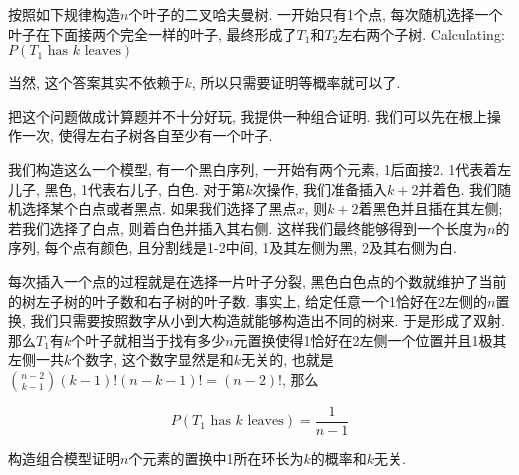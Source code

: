 	\begin{prob} [二叉树$\uppercase\expandafter{\romannumeral5}$]
		
		按照如下规律构造$n$个叶子的二叉哈夫曼树. 一开始只有1个点, 每次随机选择一个叶子在下面接两个完全一样的叶子, 最终形成了$T_1$和$T_2$左右两个子树. Calculating: $P(T_1 \text{ has } k \text{ leaves})$
		
		当然, 这个答案其实不依赖于$k$, 所以只需要证明等概率就可以了.
		
		\sol
		
		把这个问题做成计算题并不十分好玩, 我提供一种组合证明. 我们可以先在根上操作一次, 使得左右子树各自至少有一个叶子.
		
		我们构造这么一个模型, 有一个黑白序列, 一开始有两个元素, 1后面接2. 1代表着左儿子, 黑色, 1代表右儿子, 白色. 对于第$k$次操作, 我们准备插入$k + 2$并着色. 我们随机选择某个白点或者黑点. 如果我们选择了黑点$x$, 则$k + 2$着黑色并且插在其左侧; 若我们选择了白点, 则着白色并插入其右侧. 这样我们最终能够得到一个长度为$n$的序列, 每个点有颜色, 且分割线是1-2中间, 1及其左侧为黑, 2及其右侧为白. 
		
		每次插入一个点的过程就是在选择一片叶子分裂, 黑色白色点的个数就维护了当前的树左子树的叶子数和右子树的叶子数. 事实上, 给定任意一个1恰好在2左侧的$n$置换, 我们只需要按照数字从小到大构造就能够构造出不同的树来. 于是形成了双射. 那么$T_1$有$k$个叶子就相当于找有多少$n$元置换使得1恰好在2左侧一个位置并且1极其左侧一共$k$个数字, 这个数字显然是和$k$无关的, 也就是$\binom{n - 2}{k - 1} (k - 1)! (n - k - 1)! = (n - 2)!$, 那么
		
		\begin{equation*}
			P(T_1 \text{ has } k \text{ leaves}) = \dfrac{1}{n - 1}
		\end{equation*}
		
	\end{prob}

	\begin{home}
		构造组合模型证明$n$个元素的置换中1所在环长为$k$的概率和$k$无关.
	\end{home}


